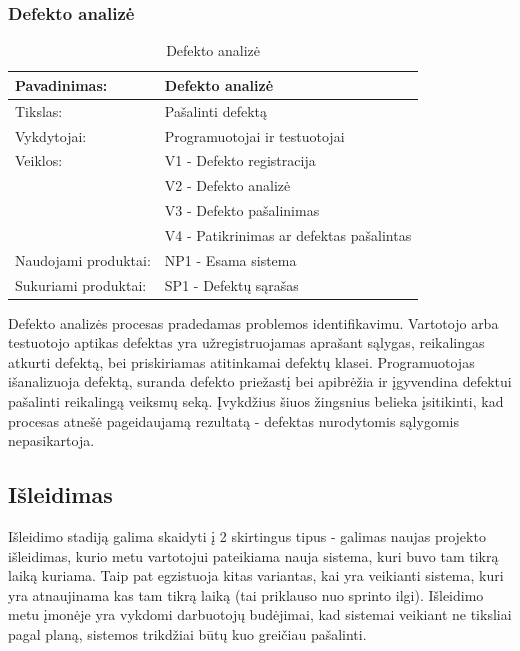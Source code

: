 \documentclass{VUMIFPSkursinis}
\begin{document}
	\subsubsection{Defekto analizė}
	\begin{center}
		\begin{table}[ht]
		\caption{Defekto analizė}
		\begin{tabular}{ | l | l | } 
		\hline
		Pavadinimas:         & Defekto analizė                               \\ \hline
		Tikslas: 	           & Pašalinti defektą\\ \hline
		Vykdytojai:          & Programuotojai ir testuotojai                                \\ \hline
		Veiklos:             & V1 - Defekto registracija 													\\ 
						             & V2 - Defekto analizė \\ 
									  & V3 - Defekto pašalinimas 																			 \\ 
									  & V4 - Patikrinimas ar defektas pašalintas \\ \hline
		Naudojami produktai: & NP1 - Esama sistema																																															 \\ \hline
		Sukuriami produktai: & SP1 - Defektų sąrašas																											\\ \hline
		\end{tabular}
	\end{table}
		\end{center}
	Defekto analizės procesas pradedamas problemos identifikavimu. Vartotojo arba testuotojo aptikas defektas yra užregistruojamas aprašant sąlygas, reikalingas atkurti defektą, bei priskiriamas atitinkamai defektų klasei. Programuotojas išanalizuoja defektą, suranda defekto priežastį bei apibrėžia ir įgyvendina defektui pašalinti reikalingą veiksmų seką. Įvykdžius šiuos žingsnius belieka įsitikinti, kad procesas atnešė pageidaujamą rezultatą - defektas nurodytomis sąlygomis nepasikartoja.
	\subsection{Išleidimas}
	Išleidimo stadiją galima skaidyti į 2 skirtingus tipus - galimas naujas projekto išleidimas, kurio metu vartotojui pateikiama nauja sistema, kuri buvo tam tikrą laiką kuriama. Taip pat egzistuoja kitas variantas, kai yra veikianti sistema, kuri yra atnaujinama kas tam tikrą laiką (tai priklauso nuo sprinto ilgi). Išleidimo metu įmonėje yra vykdomi darbuotojų budėjimai, kad sistemai veikiant ne tiksliai pagal planą, sistemos trikdžiai būtų kuo greičiau pašalinti.
\end{document}
